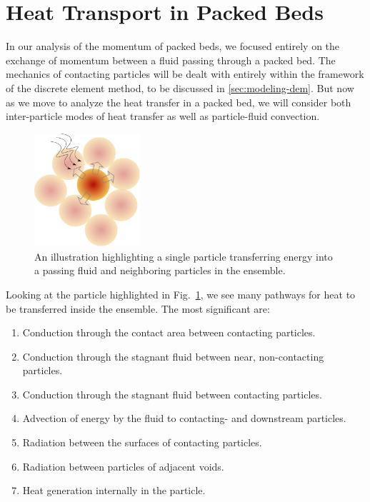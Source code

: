 \section{Heat Transport in Packed Beds} \label{sec:modeling-heat-transfer}
In our analysis of the momentum of packed beds, we focused entirely on the exchange of momentum between a fluid passing through a packed bed. The mechanics of contacting particles will be dealt with entirely within the framework of the discrete element method, to be discussed in \cref{sec:modeling-dem}. But now as we move to analyze the heat transfer in a packed bed, we will consider both inter-particle modes of heat transfer as well as particle-fluid convection. 


\begin{figure}[t]
	\centering
	\includegraphics[width=0.35\textwidth]{chapters/figures/pebble-complete-heat-transfer}
	\caption{An illustration highlighting a single particle transferring energy into a passing fluid and neighboring particles in the ensemble.}\label{fig:peb-comp-ht}
\end{figure}

Looking at the particle highlighted in Fig.~\ref{fig:peb-comp-ht}, we see many pathways for heat to be transferred inside the ensemble. The most significant are:

\begin{enumerate}
\item Conduction through the contact area between contacting particles.
\item Conduction through the stagnant fluid between near, non-contacting particles.
\item Conduction through the stagnant fluid between contacting particles.
\item Advection of energy by the fluid to contacting- and downstream particles.
\item Radiation between the surfaces of contacting particles.
\item Radiation between particles of adjacent voids.
\item Heat generation internally in the particle.
\end{enumerate}

